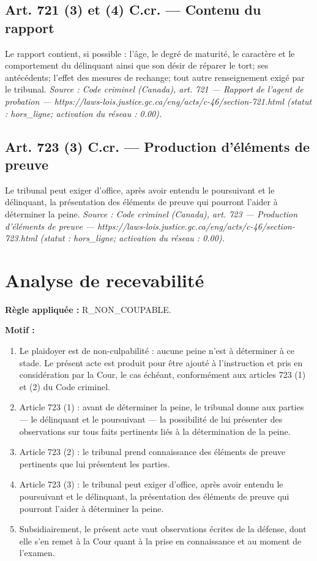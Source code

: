 \documentclass[12pt,letterpaper,oneside]{article}
\begin{document}
\subsection*{Art. 721 (3) et (4) C.cr. — Contenu du rapport}
Le rapport contient, si possible : l'âge, le degré de maturité, le caractère et le comportement du délinquant ainsi que son désir de réparer le tort; ses antécédents; l'effet des mesures de rechange; tout autre renseignement exigé par le tribunal.
\emph{Source : Code criminel (Canada), art. 721 — Rapport de l'agent de probation — https://laws-lois.justice.gc.ca/eng/acts/c-46/section-721.html (statut : hors\_ligne; activation du réseau : 0.00).}

\subsection*{Art. 723 (3) C.cr. — Production d'éléments de preuve}
Le tribunal peut exiger d'office, après avoir entendu le poursuivant et le délinquant, la présentation des éléments de preuve qui pourront l'aider à déterminer la peine.
\emph{Source : Code criminel (Canada), art. 723 — Production d'éléments de preuve — https://laws-lois.justice.gc.ca/eng/acts/c-46/section-723.html (statut : hors\_ligne; activation du réseau : 0.00).}


\section{Analyse de recevabilité}
\textbf{Règle appliquée :} R\_NON\_COUPABLE.

\textbf{Motif :}

\begin{enumerate}[leftmargin=*]
\item Le plaidoyer est de non-culpabilité : aucune peine n'est à déterminer à ce stade. Le présent acte est produit pour être ajouté à l'instruction et pris en considération par la Cour, le cas échéant, conformément aux articles 723 (1) et (2) du Code criminel.
\item Article 723 (1) : avant de déterminer la peine, le tribunal donne aux parties — le délinquant et le poursuivant — la possibilité de lui présenter des observations sur tous faits pertinents liés à la détermination de la peine.
\item Article 723 (2) : le tribunal prend connaissance des éléments de preuve pertinents que lui présentent les parties.
\item Article 723 (3) : le tribunal peut exiger d'office, après avoir entendu le poursuivant et le délinquant, la présentation des éléments de preuve qui pourront l'aider à déterminer la peine.
\item Subsidiairement, le présent acte vaut observations écrites de la défense, dont elle s'en remet à la Cour quant à la prise en connaissance et au moment de l'examen.
\end{enumerate}
\end{document}
